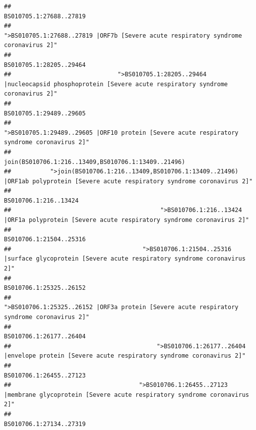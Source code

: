 \documentclass[
]{article}
\begin{document}
\begin{verbatim}
##                                                                                                                BS010705.1:27688..27819 
##                                                    ">BS010705.1:27688..27819 |ORF7b [Severe acute respiratory syndrome coronavirus 2]" 
##                                                                                                                BS010705.1:28205..29464 
##                              ">BS010705.1:28205..29464 |nucleocapsid phosphoprotein [Severe acute respiratory syndrome coronavirus 2]" 
##                                                                                                                BS010705.1:29489..29605 
##                                            ">BS010705.1:29489..29605 |ORF10 protein [Severe acute respiratory syndrome coronavirus 2]" 
##                                                                                    join(BS010706.1:216..13409,BS010706.1:13409..21496) 
##           ">join(BS010706.1:216..13409,BS010706.1:13409..21496) |ORF1ab polyprotein [Severe acute respiratory syndrome coronavirus 2]" 
##                                                                                                                  BS010706.1:216..13424 
##                                          ">BS010706.1:216..13424 |ORF1a polyprotein [Severe acute respiratory syndrome coronavirus 2]" 
##                                                                                                                BS010706.1:21504..25316 
##                                     ">BS010706.1:21504..25316 |surface glycoprotein [Severe acute respiratory syndrome coronavirus 2]" 
##                                                                                                                BS010706.1:25325..26152 
##                                            ">BS010706.1:25325..26152 |ORF3a protein [Severe acute respiratory syndrome coronavirus 2]" 
##                                                                                                                BS010706.1:26177..26404 
##                                         ">BS010706.1:26177..26404 |envelope protein [Severe acute respiratory syndrome coronavirus 2]" 
##                                                                                                                BS010706.1:26455..27123 
##                                    ">BS010706.1:26455..27123 |membrane glycoprotein [Severe acute respiratory syndrome coronavirus 2]" 
##                                                                                                                BS010706.1:27134..27319 

\end{verbatim}
\end{document}
